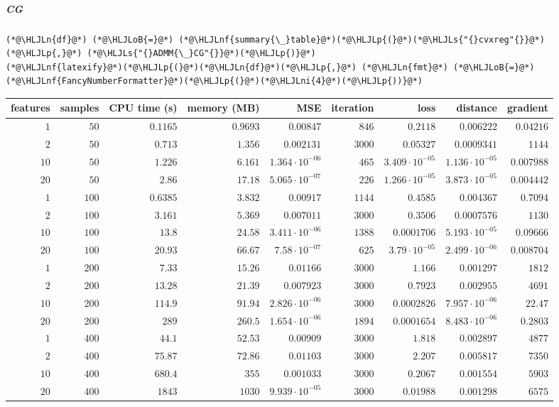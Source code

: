 \documentclass[12pt,a4paper]{article}
\newcommand{\HLJLn}[1]{#1}
\newcommand{\HLJLnf}[1]{\textcolor[RGB]{66,102,213}{#1}}
\newcommand{\HLJLs}[1]{\textcolor[RGB]{201,61,57}{#1}}
\newcommand{\HLJLni}[1]{\textcolor[RGB]{59,151,46}{#1}}
\newcommand{\HLJLoB}[1]{\textcolor[RGB]{102,102,102}{\textbf{#1}}}
\newcommand{\HLJLp}[1]{#1}
\begin{document}
\subparagraph{CG}

\begin{lstlisting}
(*@\HLJLn{df}@*) (*@\HLJLoB{=}@*) (*@\HLJLnf{summary{\_}table}@*)(*@\HLJLp{(}@*)(*@\HLJLs{"{}cvxreg"{}}@*)(*@\HLJLp{,}@*) (*@\HLJLs{"{}ADMM{\_}CG"{}}@*)(*@\HLJLp{)}@*)
(*@\HLJLnf{latexify}@*)(*@\HLJLp{(}@*)(*@\HLJLn{df}@*)(*@\HLJLp{,}@*) (*@\HLJLn{fmt}@*) (*@\HLJLoB{=}@*) (*@\HLJLnf{FancyNumberFormatter}@*)(*@\HLJLp{(}@*)(*@\HLJLni{4}@*)(*@\HLJLp{))}@*)
\end{lstlisting}


\begin{tabular}
{r | r | r | r | r | r | r | r | r}
features & samples & CPU time (s) & memory (MB) & MSE & iteration & loss & distance & gradient \\
\hline
$1$ & $50$ & $0.1165$ & $0.9693$ & $0.00847$ & $846$ & $0.2118$ & $0.006222$ & $0.04216$ \\
$2$ & $50$ & $0.713$ & $1.356$ & $0.002131$ & $3000$ & $0.05327$ & $0.0009341$ & $1144$ \\
$10$ & $50$ & $1.226$ & $6.161$ & $1.364 \cdot 10^{-06}$ & $465$ & $3.409 \cdot 10^{-05}$ & $1.136 \cdot 10^{-05}$ & $0.007988$ \\
$20$ & $50$ & $2.86$ & $17.18$ & $5.065 \cdot 10^{-07}$ & $226$ & $1.266 \cdot 10^{-05}$ & $3.873 \cdot 10^{-05}$ & $0.004442$ \\
$1$ & $100$ & $0.6385$ & $3.832$ & $0.00917$ & $1144$ & $0.4585$ & $0.004367$ & $0.7094$ \\
$2$ & $100$ & $3.161$ & $5.369$ & $0.007011$ & $3000$ & $0.3506$ & $0.0007576$ & $1130$ \\
$10$ & $100$ & $13.8$ & $24.58$ & $3.411 \cdot 10^{-06}$ & $1388$ & $0.0001706$ & $5.193 \cdot 10^{-05}$ & $0.09666$ \\
$20$ & $100$ & $20.93$ & $66.67$ & $7.58 \cdot 10^{-07}$ & $625$ & $3.79 \cdot 10^{-05}$ & $2.499 \cdot 10^{-06}$ & $0.008704$ \\
$1$ & $200$ & $7.33$ & $15.26$ & $0.01166$ & $3000$ & $1.166$ & $0.001297$ & $1812$ \\
$2$ & $200$ & $13.28$ & $21.39$ & $0.007923$ & $3000$ & $0.7923$ & $0.002955$ & $4691$ \\
$10$ & $200$ & $114.9$ & $91.94$ & $2.826 \cdot 10^{-06}$ & $3000$ & $0.0002826$ & $7.957 \cdot 10^{-06}$ & $22.47$ \\
$20$ & $200$ & $289$ & $260.5$ & $1.654 \cdot 10^{-06}$ & $1894$ & $0.0001654$ & $8.483 \cdot 10^{-06}$ & $0.2803$ \\
$1$ & $400$ & $44.1$ & $52.53$ & $0.00909$ & $3000$ & $1.818$ & $0.002897$ & $4877$ \\
$2$ & $400$ & $75.87$ & $72.86$ & $0.01103$ & $3000$ & $2.207$ & $0.005817$ & $7350$ \\
$10$ & $400$ & $680.4$ & $355$ & $0.001033$ & $3000$ & $0.2067$ & $0.001554$ & $5903$ \\
$20$ & $400$ & $1843$ & $1030$ & $9.939 \cdot 10^{-05}$ & $3000$ & $0.01988$ & $0.001298$ & $6575$ \\
\end{tabular}
\end{document}
